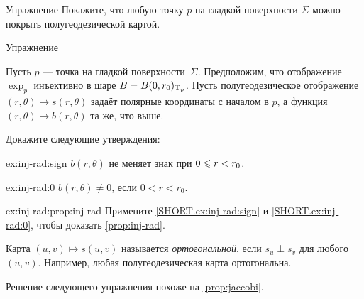 \begin{thm}{Упражнение}\label{ex:semigeodesc-chart}
Покажите, что любую точку $p$ на гладкой поверхности $\Sigma$ можно покрыть полугеодезической картой.
\end{thm}

\begin{thm}{Упражнение}\label{ex:inj-rad}
{\sloppy
Пусть $p$ --- точка на гладкой поверхности~$\Sigma$.
Предположим, что отображение $\exp_p$ инъективно в шаре $B\z=B(0,r_0)_{\T_p}$.
Пусть полугеодезическое отображение $(r,\theta)\mapsto s(r,\theta)$ задаёт полярные координаты с началом в $p$, а функция $(r,\theta)\mapsto b(r,\theta)$ та же, что выше.

}

Докажите следующие утверждения:

\begin{subthm}{ex:inj-rad:sign}
$b(r,\theta)$ не меняет знак при $0\z\le r\z<r_0$.
\end{subthm}

\begin{subthm}{ex:inj-rad:0}
$b(r,\theta)\ne0$, если $0< r<r_0$.
\end{subthm}

\begin{subthm}{ex:inj-rad:prop:inj-rad}
Примените \ref{SHORT.ex:inj-rad:sign} и \ref{SHORT.ex:inj-rad:0}, чтобы доказать \ref{prop:inj-rad}.
\end{subthm}
 
\end{thm}


Карта $(u,v)\mapsto s(u,v)$ называется \emph{ортогональной}, если $s_u\perp s_v$ для любого $(u,v)$.
Например, любая полугеодезическая карта ортогональна.

Решение следующего упражнения похоже на \ref{prop:jaccobi}.

